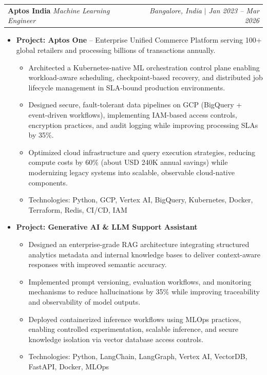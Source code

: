 \documentclass[letterpaper,10pt]{article}
\makeatletter
\newcommand{\resumeItem}[1]{\item\small{#1}}
\newcommand{\resumeSubheading}[4]{
\vspace{-1pt}\item
  \begin{tabular*}{0.97\textwidth}[t]{l@{\extracolsep{\fill}}r}
    \textbf{#1} \hspace{0.4em}\textbar\hspace{0.4em} \textit{#3} & \textit{#4} $|$ \textit{#2} \\
  \end{tabular*}\vspace{-7pt}
}
\newcommand{\resumeSubHeadingList}{\begin{itemize}[leftmargin=0.15in, label={}]}
\newcommand{\resumeSubHeadingListEnd}{\end{itemize}}
\makeatother
\begin{document}
  \resumeSubheading
      {Aptos India}{Jan 2023 -- Mar 2026}
      {Machine Learning Engineer}{Bangalore, India}
      \resumeSubHeadingList
          \resumeItem{\textbf{Project: Aptos One} -- Enterprise Unified Commerce Platform serving 100+ global retailers and processing billions of transactions annually.}
          \begin{itemize}[leftmargin=1.4em,label=•]
              \item \small{Architected a Kubernetes-native ML orchestration control plane enabling workload-aware scheduling, checkpoint-based recovery, and distributed job lifecycle management in SLA-bound production environments.}
              \item \small{Designed secure, fault-tolerant data pipelines on GCP (BigQuery + event-driven workflows), implementing IAM-based access controls, encryption practices, and audit logging while improving processing SLAs by 35\%.}
              \item \small{Optimized cloud infrastructure and query execution strategies, reducing compute costs by 60\% (about USD 240K annual savings) while modernizing legacy systems into scalable, observable cloud-native components.}
              \item \small{Technologies: Python, GCP, Vertex AI, BigQuery, Kubernetes, Docker, Terraform, Redis, CI/CD, IAM}
          \end{itemize}
          \resumeItem{\textbf{Project: Generative AI \& LLM Support Assistant}}
          \begin{itemize}[leftmargin=1.4em,label=•]
              \item \small{Designed an enterprise-grade RAG architecture integrating structured analytics metadata and internal knowledge bases to deliver context-aware responses with improved semantic accuracy.}
              \item \small{Implemented prompt versioning, evaluation workflows, and monitoring mechanisms to reduce hallucinations by 35\% while improving traceability and observability of model outputs.}
              \item \small{Deployed containerized inference workflows using MLOps practices, enabling controlled experimentation, scalable inference, and secure knowledge isolation via vector database access controls.}
              \item \small{Technologies: Python, LangChain, LangGraph, Vertex AI, VectorDB, FastAPI, Docker, MLOps}
          \end{itemize}
      \resumeSubHeadingListEnd
\end{document}
